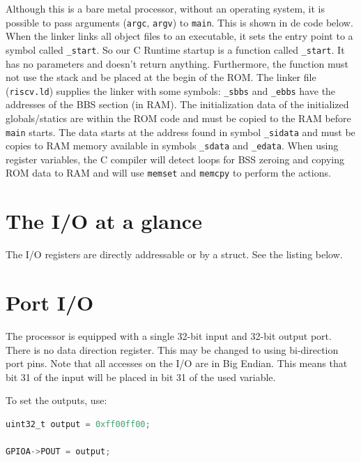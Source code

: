 \documentclass[12pt]{article}
\begin{document}
Although this is a bare metal processor, without an operating system, it is possible to pass arguments (\lstinline|argc|, \lstinline|argv|) to \lstinline|main|. This is shown in de code below. When the linker links all object files to an executable, it sets the entry point to a symbol called \lstinline|_start|. So our C Runtime startup is a function called \lstinline|_start|. It has no parameters and doesn't return anything. Furthermore, the function must not use the stack and be placed at the begin of the ROM. The linker file (\lstinline|riscv.ld|) supplies the linker with some symbols: \lstinline|_sbbs| and \lstinline|_ebbs| have the addresses of the BBS section (in RAM). The initialization data of the initialized globals/statics are within the ROM code and must be copied to the RAM before \lstinline|main| starts. The data starts at the address found in symbol \lstinline|_sidata| and must be copies to RAM memory available in symbols \lstinline|_sdata| and \lstinline|_edata|.
When using register variables, the C compiler will detect loops for BSS zeroing and copying ROM data to RAM and will use \lstinline|memset| and \lstinline|memcpy| to perform the actions.



\section{The I/O at a glance}

The I/O registers are directly addressable or by a struct. See the listing below.



\section{Port I/O}
The processor is equipped with a single 32-bit input and 32-bit output port. There is no data direction register. This may be changed to using bi-direction port pins. Note that all accesses on the I/O are in Big Endian. This means that bit 31 of the input will be placed in bit 31 of the used variable.

To set the outputs, use:

\begin{lstlisting}[language=C]
uint32_t output = 0xff00ff00;

GPIOA->POUT = output;
\end{lstlisting}
\end{document}
